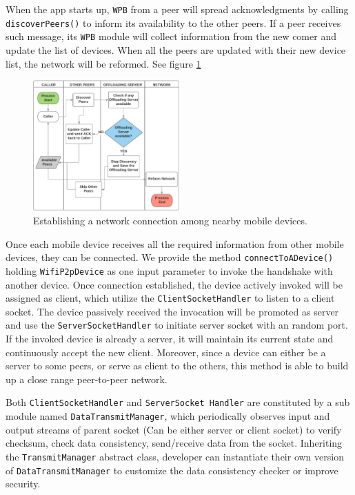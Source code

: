 \documentclass[conference]{IEEEtran}
\begin{document}
When the app starts up, \texttt{WPB} from a peer will spread acknowledgments by calling \texttt{discoverPeers()} to inform its availability to the other peers. If a peer receives such message, its \texttt{WPB} module will collect information from the new comer and update the list of devices. When all the peers are updated with their new device list, the network will be reformed. See figure \ref{fig:forming}

\begin{figure}[H]
\centerline {
\includegraphics[width=0.5\textwidth, natwidth=1127, natheight=615]{data/discoverPeers}
}
\caption{Establishing a network connection among nearby mobile devices.}
\label{fig:forming}
\end{figure}

Once each mobile device receives all the required information from other mobile devices, they can be connected. We provide the method \texttt{connectToADevice()} holding \texttt{WifiP2pDevice} as one input parameter to invoke the handshake with another device. Once connection established, the device actively invoked will be assigned as client, which utilize the \texttt{ClientSocketHandler} to listen to a client socket. The device passively received the invocation will be promoted as server and use the \texttt{ServerSocketHandler} to initiate server socket with an random port. If the invoked device is already a server, it will maintain its current state and continuously accept the new client. Moreover, since a device can either be a server to some peers, or serve as client to the others, this method is able to build up a close range peer-to-peer network.

Both \texttt{ClientSocketHandler} and \texttt{ServerSocket Handler} are constituted by a sub module named \texttt{DataTransmitManager}, which periodically observes input and output streams of parent socket (Can be either server or client socket) to verify checksum, check data consistency, send/receive data from the socket. Inheriting the \texttt{TransmitManager} abstract class, developer can instantiate their own version of \texttt{DataTransmitManager} to customize the data consistency checker or improve security. 
\end{document}
